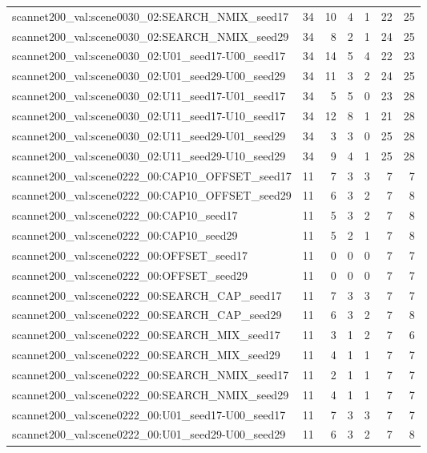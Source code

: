 \begin{table}[t]
\begin{tabular}{lrrrrrr}
scannet200\_val:scene0030\_02:SEARCH\_NMIX\_seed17 & 34 & 10 & 4 & 1 & 22 & 25 \\
scannet200\_val:scene0030\_02:SEARCH\_NMIX\_seed29 & 34 & 8 & 2 & 1 & 24 & 25 \\
scannet200\_val:scene0030\_02:U01\_seed17-U00\_seed17 & 34 & 14 & 5 & 4 & 22 & 23 \\
scannet200\_val:scene0030\_02:U01\_seed29-U00\_seed29 & 34 & 11 & 3 & 2 & 24 & 25 \\
scannet200\_val:scene0030\_02:U11\_seed17-U01\_seed17 & 34 & 5 & 5 & 0 & 23 & 28 \\
scannet200\_val:scene0030\_02:U11\_seed17-U10\_seed17 & 34 & 12 & 8 & 1 & 21 & 28 \\
scannet200\_val:scene0030\_02:U11\_seed29-U01\_seed29 & 34 & 3 & 3 & 0 & 25 & 28 \\
scannet200\_val:scene0030\_02:U11\_seed29-U10\_seed29 & 34 & 9 & 4 & 1 & 25 & 28 \\
scannet200\_val:scene0222\_00:CAP10\_OFFSET\_seed17 & 11 & 7 & 3 & 3 & 7 & 7 \\
scannet200\_val:scene0222\_00:CAP10\_OFFSET\_seed29 & 11 & 6 & 3 & 2 & 7 & 8 \\
scannet200\_val:scene0222\_00:CAP10\_seed17 & 11 & 5 & 3 & 2 & 7 & 8 \\
scannet200\_val:scene0222\_00:CAP10\_seed29 & 11 & 5 & 2 & 1 & 7 & 8 \\
scannet200\_val:scene0222\_00:OFFSET\_seed17 & 11 & 0 & 0 & 0 & 7 & 7 \\
scannet200\_val:scene0222\_00:OFFSET\_seed29 & 11 & 0 & 0 & 0 & 7 & 7 \\
scannet200\_val:scene0222\_00:SEARCH\_CAP\_seed17 & 11 & 7 & 3 & 3 & 7 & 7 \\
scannet200\_val:scene0222\_00:SEARCH\_CAP\_seed29 & 11 & 6 & 3 & 2 & 7 & 8 \\
scannet200\_val:scene0222\_00:SEARCH\_MIX\_seed17 & 11 & 3 & 1 & 2 & 7 & 6 \\
scannet200\_val:scene0222\_00:SEARCH\_MIX\_seed29 & 11 & 4 & 1 & 1 & 7 & 7 \\
scannet200\_val:scene0222\_00:SEARCH\_NMIX\_seed17 & 11 & 2 & 1 & 1 & 7 & 7 \\
scannet200\_val:scene0222\_00:SEARCH\_NMIX\_seed29 & 11 & 4 & 1 & 1 & 7 & 7 \\
scannet200\_val:scene0222\_00:U01\_seed17-U00\_seed17 & 11 & 7 & 3 & 3 & 7 & 7 \\
scannet200\_val:scene0222\_00:U01\_seed29-U00\_seed29 & 11 & 6 & 3 & 2 & 7 & 8 \\

\end{tabular}
\end{table}
